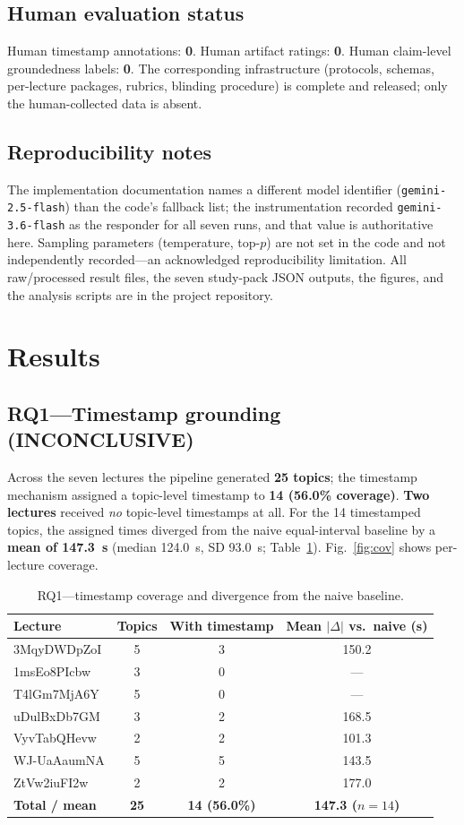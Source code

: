 \documentclass[conference]{IEEEtran}
\begin{document}
\subsection{Human evaluation status}
Human timestamp annotations: \textbf{0}. Human artifact ratings: \textbf{0}. Human claim-level groundedness labels: \textbf{0}. The corresponding infrastructure (protocols, schemas, per-lecture packages, rubrics, blinding procedure) is complete and released; only the human-collected data is absent.

\subsection{Reproducibility notes}
The implementation documentation names a different model identifier (\texttt{gemini-2.5-flash}) than the code's fallback list; the instrumentation recorded \texttt{gemini-3.6-flash} as the responder for all seven runs, and that value is authoritative here. Sampling parameters (temperature, top-$p$) are not set in the code and not independently recorded---an acknowledged reproducibility limitation. All raw/processed result files, the seven study-pack JSON outputs, the figures, and the analysis scripts are in the project repository.

\section{Results}
\subsection{RQ1---Timestamp grounding (INCONCLUSIVE)}
Across the seven lectures the pipeline generated \textbf{25 topics}; the timestamp mechanism assigned a topic-level timestamp to \textbf{14 (56.0\% coverage)}. \textbf{Two lectures} received \emph{no} topic-level timestamps at all. For the 14 timestamped topics, the assigned times diverged from the naive equal-interval baseline by a \textbf{mean of 147.3~s} (median 124.0~s, SD 93.0~s; Table~\ref{tab:rq1}). Fig.~\ref{fig:cov} shows per-lecture coverage.

\begin{table}[t]
\caption{RQ1---timestamp coverage and divergence from the naive baseline.}
\label{tab:rq1}
\centering
\begin{tabular}{@{}lccc@{}}
\toprule
\textbf{Lecture} & \textbf{Topics} & \textbf{With timestamp} & \textbf{Mean $|\Delta|$ vs.\ naive (s)} \\
\midrule
3MqyDWDpZoI & 5 & 3 & 150.2 \\
1msEo8PIcbw & 3 & 0 & --- \\
T4lGm7MjA6Y & 5 & 0 & --- \\
uDulBxDb7GM & 3 & 2 & 168.5 \\
VyvTabQHevw & 2 & 2 & 101.3 \\
WJ-UaAaumNA & 5 & 5 & 143.5 \\
ZtVw2iuFI2w & 2 & 2 & 177.0 \\
\midrule
\textbf{Total / mean} & \textbf{25} & \textbf{14 (56.0\%)} & \textbf{147.3 ($n{=}14$)} \\
\bottomrule
\end{tabular}
\end{table}
\end{document}
